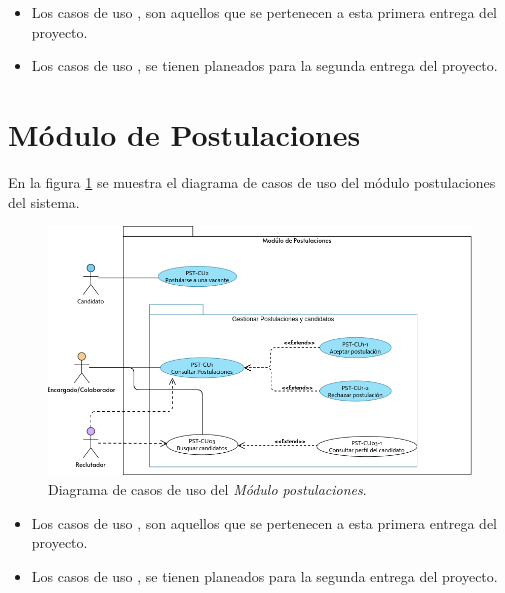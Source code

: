 	\begin{itemize}
        \item Los casos de uso \IUazul{} , son aquellos que se pertenecen a esta primera entrega del proyecto.
        \item Los casos de uso \IUblanco{}, se tienen planeados para la segunda entrega del proyecto.
    \end{itemize} 

	
	

	
	

	

	
	

	
	


	\section{Módulo de Postulaciones}
	En la figura \ref{adcu:usr} se muestra el diagrama de casos de uso del módulo postulaciones del sistema.

	\begin{figure}[hbtp!]
		\begin{center}
			\includegraphics[width=.8\textwidth]{sprints/imagenes/DCUPST.png}
		\end{center}
		
		\caption{Diagrama de casos de uso del \textit{Módulo postulaciones}.}
		\label{adcu:usr}
	\end{figure}

	\begin{itemize}
        \item Los casos de uso \IUazul{} , son aquellos que se pertenecen a esta primera entrega del proyecto.
        \item Los casos de uso \IUblanco{}, se tienen planeados para la segunda entrega del proyecto.
    \end{itemize} 

	
	
	
	